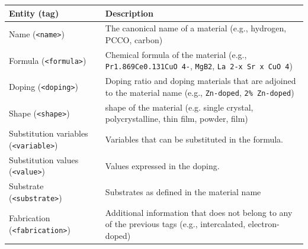 \documentclass[]{interact}
\theoremstyle{plain}%
\theoremstyle{definition}
\theoremstyle{remark}
\begin{document}
\begin{table}[ht]
    {
        \begin{tabular}{m{16em} m{30em}}
            \toprule
            \textbf{Entity} (\textbf{tag})               & \textbf{Description}                                                                                                              \\
            \midrule
            Name (\texttt{<name>})                       & The canonical name of a material (e.g., hydrogen, PCCO, carbon)                                                                    \\
            Formula (\texttt{<formula>})                 & Chemical formula of the material (e.g., \texttt{Pr1.869Ce0.131CuO 4-}, \texttt{MgB2}, \texttt{La 2-x Sr x CuO 4})                  \\
            Doping (\texttt{<doping>})                   & Doping ratio and doping materials that are adjoined to the material name (e.g., \texttt{Zn-doped}, \texttt{2\% Zn-doped})          \\
            Shape (\texttt{<shape>})                     & shape of the material (e.g. single crystal, polycrystalline, thin film, powder, film)                                             \\
            Substitution variables (\texttt{<variable>}) & Variables that can be substituted in the formula.                                                                                 \\
            Substitution values (\texttt{<value>})       & Values expressed in the doping.                                                                                                   \\
            Substrate (\texttt{<substrate>})             & Substrates as defined in the material name                                                                                        \\
            Fabrication (\texttt{<fabrication>})         & Additional information that does not belong to any of the previous tags  (e.g., intercalated, electron-doped) \\
            \bottomrule
        \end{tabular}
    }
    \label{tab:material-parser-entities}
\end{table}
\end{document}
